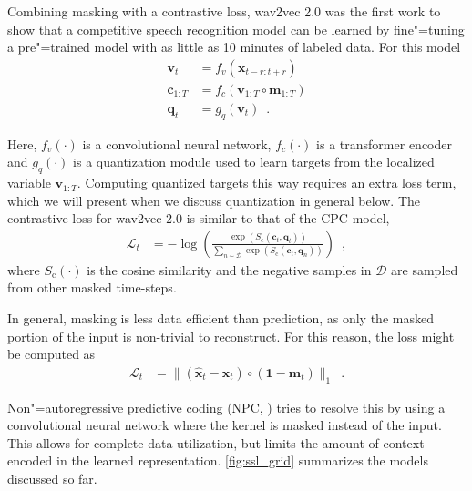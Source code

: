 {Combining masking with a contrastive loss, wav2vec 2.0 was the first work to show that a competitive speech recognition model can be learned by fine"=tuning a pre"=trained model with as little as 10 minutes of labeled data. For this model
%
\begin{align}
    \mathbf{v}_{t} &= f_v(\mathbf{x}_{t-r:t+r}) \\
    \mathbf{c}_{1:T} &= f_c(\mathbf{v}_{1:T} \circ \mathbf{m}_{1:T}) \\
    \mathbf{q}_t &= g_q(\mathbf{v}_t) \enspace . \label{eq_brief: w2v2 qtz}
\end{align}

\noindent Here, $f_v(\cdot)$ is a convolutional neural network, $f_c(\cdot)$ is a transformer encoder \parencite{vaswani_attention_2017} and $g_q(\cdot)$ is a quantization module used to learn targets from the localized variable $\mathbf{v}_{1:T}$. Computing quantized targets this way requires an extra loss term, which we will present when we discuss quantization in general below. The contrastive loss for wav2vec 2.0 is similar to that of the CPC model,
%
\begin{align}
    \mathcal{L}_t &= - \log \left(\frac{\exp(S_{\text{c}}(\mathbf{c}_{t}, \mathbf{q}_{t}))}{\sum_{n \sim \mathcal{D}} \exp(S_{\text{c}}(\mathbf{c}_{t}, \mathbf{q}_{n}))} \right) \enspace , \label{eq_brief: w2v2 loss}
\end{align}
%
\noindent where $S_{\text{c}}(\cdot)$ is the cosine similarity and the negative samples in $\mathcal{D}$ are sampled from other masked time-steps. 

In general, masking is less data efficient than prediction, as only the masked portion of the input is non-trivial to reconstruct. For this reason, the loss might be computed as
%
\begin{align}
    \mathcal{L}_t &= \lVert (\mathbf{\hat{x}}_{t} - \mathbf{x}_{t}) \circ (\mathbf{1} - \mathbf{m}_t) \rVert_1 \enspace .
\end{align}

\noindent Non"=autoregressive predictive coding (NPC, \citealp{liu_nonautoregressive_2020}) tries to resolve this by using a convolutional neural network where the kernel is masked instead of the input.
This allows for complete data utilization, but limits the amount of context encoded in the learned representation.
\cref{fig:ssl_grid} summarizes the models discussed so far.

}
